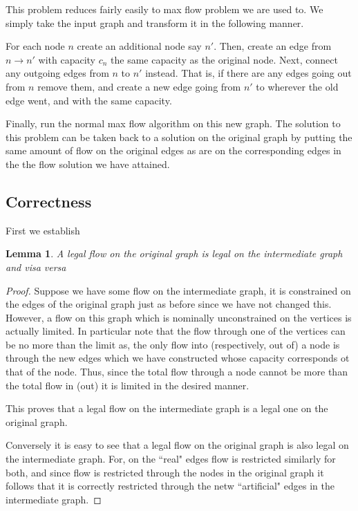 \documentclass{article}
\newtheorem{lemma}[theorem]{Lemma}
\begin{document}
This problem reduces fairly easily to max flow problem we are used to. We simply take the input graph and transform it in the following manner.  

For each node $n$ create an additional node say $n'$. Then, create an edge from $n \to n'$ with capacity $c_n$ the same capacity as the original node. Next, connect any outgoing edges from $n$ to $n'$ instead. That is, if there are any edges going out from $n$ remove them, and create a new edge going from $n'$ to wherever the old edge went, and with the same capacity. 

Finally, run the normal max flow algorithm on this new graph. The solution to this problem can be taken back to a solution on the original graph by putting the same amount of flow on the original edges as are on the corresponding edges in the the flow solution we have attained.

\subsection{Correctness}



First we establish 
\begin{lemma}A legal flow on the original graph is legal on the intermediate graph and visa versa\end{lemma}
\begin{proof}
Suppose we have some flow on the intermediate graph, it is constrained on the edges of the original graph just as before since we have not changed this. However, a flow on this graph which is nominally unconstrained on the vertices is actually limited. In particular note that the flow through one of the vertices can be no more than the limit as, the only flow into (respectively, out of) a node is through the new edges which we have constructed whose capacity corresponds ot that of the node. Thus, since the total flow through a node cannot be more than the total flow in (out) it is limited in the desired manner.

This proves that a legal flow on the intermediate graph is a legal one on the original graph.

Conversely it is easy to see that a legal flow on the original graph is also legal on the intermediate graph. For, on the ``real" edges flow is restricted similarly for both, and since flow is restricted through the nodes in the original graph it follows that it is correctly restricted through the netw ``artificial" edges in the intermediate graph.
\end{proof}
\end{document}
